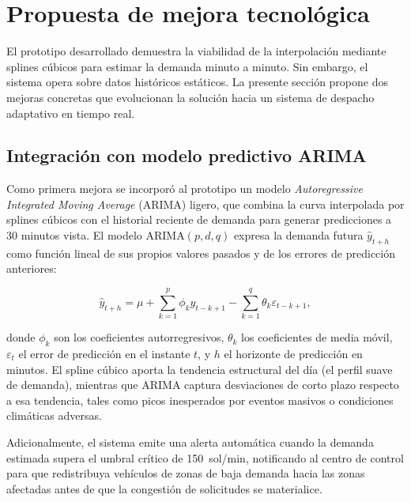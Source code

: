 \documentclass[conference]{IEEEtran}
\begin{document}
\section{Propuesta de mejora tecnológica}

El prototipo desarrollado demuestra la viabilidad de la interpolación mediante splines cúbicos para estimar la demanda
minuto a minuto. Sin embargo, el sistema opera sobre datos históricos estáticos. La presente sección propone dos mejoras
concretas que evolucionan la solución hacia un sistema de despacho adaptativo en tiempo real.

\subsection{Integración con modelo predictivo ARIMA}

Como primera mejora se incorporó al prototipo un modelo \textit{Autoregressive Integrated Moving Average} (ARIMA) ligero,
que combina la curva interpolada por splines cúbicos con el historial reciente de demanda para generar predicciones a 30
minutos vista. El modelo ARIMA$(p,d,q)$ expresa la demanda futura $\hat{y}_{t+h}$ como función lineal de sus propios
valores pasados y de los errores de predicción anteriores:

\begin{equation}
\hat{y}_{t+h} = \mu + \sum_{k=1}^{p} \phi_k y_{t-k+1}
              - \sum_{k=1}^{q} \theta_k \varepsilon_{t-k+1},
\label{eq:arima}
\end{equation}

\noindent donde $\phi_k$ son los coeficientes autorregresivos, $\theta_k$ los coeficientes de media móvil,
$\varepsilon_t$ el error de predicción en el instante $t$, y $h$ el horizonte de predicción en minutos. El spline cúbico
aporta la tendencia estructural del día (el perfil suave de demanda), mientras que ARIMA captura desviaciones de corto
plazo respecto a esa tendencia, tales como picos inesperados por eventos masivos o condiciones climáticas adversas.

Adicionalmente, el sistema emite una alerta automática cuando la demanda estimada supera el umbral crítico de
150~sol/min, notificando al centro de control para que redistribuya vehículos de zonas de baja demanda hacia las zonas
afectadas antes de que la congestión de solicitudes se materialice.
\end{document}
